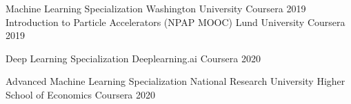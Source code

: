 

\begin{cvhonors}
  \cvhonor
        {Machine Learning Specialization} %
  {Washington University Coursera} %
    {} %
    {2019} %
    \cvhonor
        {Introduction to Particle Accelerators (NPAP MOOC)} %
  {Lund University Coursera} %
    {} %
    {2019} %

        \cvhonor
        {Deep Learning Specialization} %
        {Deeplearning.ai Coursera} %
    {} %
    {2020} %
    
            \cvhonor
            {Advanced Machine Learning Specialization} %
        {National Research University Higher School of Economics Coursera} %
    {} %
    {2020} %


     
    

\end{cvhonors}
